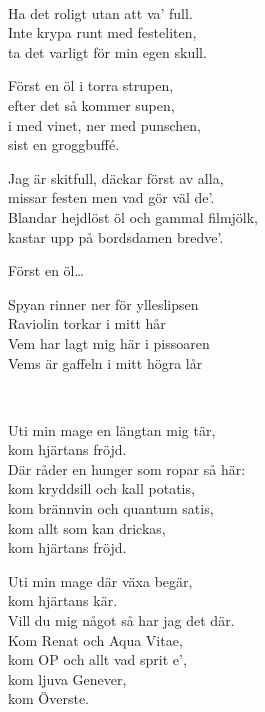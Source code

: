 {{\\
Ha det roligt utan att va' full.\\
Inte krypa runt med festeliten,\\
ta det varligt för min egen skull.

Först en öl i torra strupen,\\
efter det så kommer supen,\\
i med vinet, ner med punschen,\\
sist en groggbuffé.

Jag är skitfull, däckar först av alla,\\
missar festen men vad gör väl de'.\\
Blandar hejdlöst öl och gammal filmjölk,\\
kastar upp på bordsdamen bredve'.

Först en öl…

Spyan rinner ner för ylleslipsen\\
Raviolin torkar i mitt hår\\
Vem har lagt mig här i pissoaren\\
Vems är gaffeln i mitt högra lår


\newpage
 \\       

\songtext{}
Uti min mage en längtan mig tär, \\
kom hjärtans fröjd.\\
Där råder en hunger som ropar så här:\\
kom kryddsill och kall potatis,\\
kom brännvin och quantum satis,\\
kom allt som kan drickas,\\
kom hjärtans fröjd.

Uti min mage där växa begär,\\
kom hjärtans kär.\\
Vill du mig något så har jag det där.\\
Kom Renat och Aqua Vitae,\\
kom OP och allt vad sprit e',\\
kom ljuva Genever,\\
kom Överste.

}}
